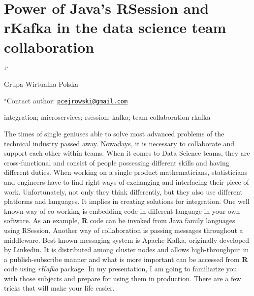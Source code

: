 \documentclass[\main/boa.tex]{subfiles}
\begin{document}
\section{Power of Java's RSession and rKafka in the data science team
collaboration}

\begin{center}
  {\bf {}$^{1^\star}$}
\end{center}

\vskip 0.3cm

\begin{affiliations}
\begin{enumerate}
\begin{minipage}{0.915\textwidth}
\centering
\item Grupa Wirtualna Polska \\[-2pt]
\end{minipage}
\end{enumerate}
$^\star$Contact author: \href{mailto:pcejrowski@gmail.com}{\nolinkurl{pcejrowski@gmail.com}}\\
\end{affiliations}

\vskip 0.5cm

\begin{minipage}{0.915\textwidth}
\keywords integration; microservices; rsession; kafka; team collaboration
\packages rkafka
\end{minipage}

\vskip 0.8cm

The times of single geniuses able to solve most advanced problems of the
technical industry passed away. Nowadays, it is necessary to collaborate
and support each other within teams. When it comes to Data Science
teams, they are cross-functional and consist of people possessing
different skills and having different duties. When working on a single
product mathematicians, statisticians and engineers have to find right
ways of exchanging and interfacing their piece of work. Unfortunately,
not only they think differently, but they also use different platforms
and languages. It implies in creating solutions for integration. One
well known way of co-working is embedding code in different language in
your own software. As an example, \textbf{R} code can be invoked from
Java family languages using RSession. Another way of collaboration is
passing messages throughout a middleware. Best known messaging system is
Apache Kafka, originally developed by Linkedin. It is distributed among
cluster nodes and allows high-throughput in a publish-subscribe manner
and what is more important can be accessed from \textbf{R} code using
\emph{rKafka} package. In my presentation, I am going to familiarize you
with those subjects and prepare for using them in production. There are
a few tricks that will make your life easier.
\end{document}
